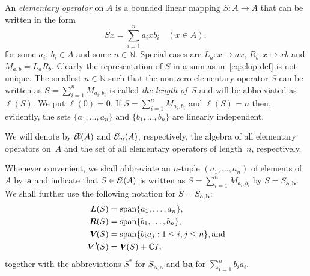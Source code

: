 \documentclass[a4paper,12pt,reqno]{amsart}
\numberwithin{equation}{section}
\theoremstyle{definition}
\begin{document}
An \textit{elementary operator\/} on $A$ is a bounded linear mapping $S\colon A\to A$ that can be written in the form
\begin{equation}\label{eq:elop-def}
Sx =\sum_{i=1}^n a_ixb_i\quad(x\in A),
\end{equation}
for some $a_i,\,b_i\in A$ and some $n\in{\mathbb{N}}$. Special cases are $L_a\colon x\mapsto ax$, $R_b\colon x\mapsto xb$ and
$M_{a,b}=L_aR_b$. Clearly the representation  of $S$ in a sum as in~\eqref{eq:elop-def} is not unique.
The smallest $n\in{\mathbb{N}}$ such that the non-zero elementary operator $S$ can be written as $S=\sum_{i=1}^n M_{a_i,b_i}$
is called \textit{the length of}~$S$ and will be abbreviated as~$\ell(S)$. We put $\ell(0)=0$. If $S=\sum_{i=1}^n M_{a_i,b_i}$
and $\ell(S)=n$ then, evidently, the sets $\{a_1,\ldots,a_n\}$ and $\{b_1,\ldots,b_n\}$ are linearly independent.

We will denote by ${{\mathcal{E}\kern-2.6pt\ell(A)}}$ and ${{\mathcal{E}\kern-2.6pt\ell_n(A)}}$, respectively, the algebra of all elementary operators on~$A$ and
the set of all elementary operators of length~$n$, respectively.

Whenever convenient, we shall abbreviate an $n$-tuple $(a_1,\ldots,a_n)$ of elements of $A$ by~$\bm a$ and indicate that $S\in{{\mathcal{E}\kern-2.6pt\ell(A)}}$
is written as ${S} =\sum_{i=1}^n M_{a_i, b_i}$ by $S=S_{\bm a,\bm b}$.
We shall further use the following notation for  $S=S_{\bm a,\bm b}$:
\begin{equation*}\label{eq:notation}
\begin{split}
{{\bm L(S)}}  &= {{\rm span}} \{a_1, \ldots, a_n \},\\
{{\bm R(S)}}  &= {{\rm span}} \{b_1, \ldots, b_n\},\\
{{\bm V\mkern-2.5mu(S)}}  &= {{\rm span}} \{b_i a_j: 1 \leq i,j \leq n\},\text{and}\\
{{\bm{V'}\mkern-2.5mu(S)}}&={{\bm V\mkern-2.5mu(S)}}+{\mathbb{C}} I,
\end{split}
\end{equation*}
together with the abbreviations $S^*$ for $S_{\bm b,\bm a}$ and $\bm{ba}$ for $\sum_{i=1}^n b_ia_i$.
\end{document}
